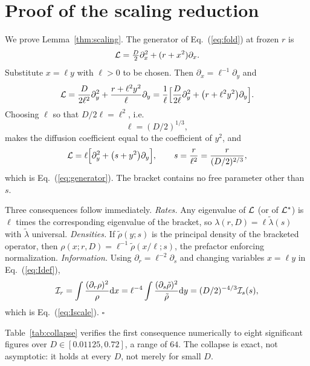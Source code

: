 \section{\label{app:scaling}Proof of the scaling reduction}

We prove Lemma~\ref{thm:scaling}.  The generator of Eq.~(\ref{eq:fold}) at frozen $r$ is
\begin{equation}
\mathcal{L}=\tfrac D2\partial_x^2+(r+x^2)\partial_x .
\end{equation}
Substitute $x=\ell y$ with $\ell>0$ to be chosen.  Then $\partial_x=\ell^{-1}\partial_y$ and
\begin{equation}
\mathcal{L}=\frac{D}{2\ell^2}\partial_y^2+\frac{r+\ell^2y^2}{\ell}\partial_y
=\frac1\ell\Bigl[\frac{D}{2\ell}\partial_y^2+\bigl(r+\ell^2y^2\bigr)\partial_y\Bigr].
\end{equation}
Choosing $\ell$ so that $D/2\ell=\ell^2$, i.e.
\begin{equation}
\ell=(D/2)^{1/3},
\end{equation}
makes the diffusion coefficient equal to the coefficient of $y^2$, and
\begin{equation}
\mathcal{L}=\ell\Bigl[\partial_y^2+\bigl(s+y^2\bigr)\partial_y\Bigr],
\qquad s=\frac{r}{\ell^2}=\frac{r}{(D/2)^{2/3}},
\end{equation}
which is Eq.~(\ref{eq:generator}).  The bracket contains no free parameter other than $s$.

Three consequences follow immediately.  \emph{Rates.}  Any eigenvalue of $\mathcal{L}$ (or of $\mathcal{L}^\ast$) is $\ell$ times the corresponding eigenvalue of the bracket, so $\lambda(r,D)=\ell\tilde\lambda(s)$ with $\tilde\lambda$ universal.  \emph{Densities.}  If $\tilde\rho(y;s)$ is the principal density of the bracketed operator, then $\rho(x;r,D)=\ell^{-1}\tilde\rho(x/\ell;s)$, the prefactor enforcing normalization.  \emph{Information.}  Using $\partial_r=\ell^{-2}\partial_s$ and changing variables $x=\ell y$ in Eq.~(\ref{eq:Idef}),
\begin{equation}
\mathcal{I}_r=\int\frac{(\partial_r\rho)^2}{\rho}\mathrm{d} x
=\ell^{-4}\int\frac{(\partial_s\tilde\rho)^2}{\tilde\rho}\mathrm{d} y
=(D/2)^{-4/3}\mathcal{I}_s(s),
\end{equation}
which is Eq.~(\ref{eq:Iscale}).  $\square$

\medskip
Table~\ref{tab:collapse} verifies the first consequence numerically to eight significant figures over $D\in[0.01125,0.72]$, a range of $64$.  The collapse is exact, not asymptotic: it holds at every $D$, not merely for small $D$.

